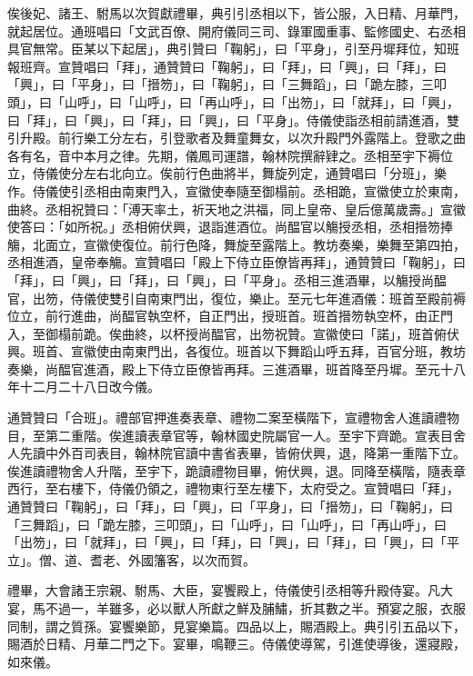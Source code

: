 \begin{pinyinscope}
 俟後妃、諸王、駙馬以次賀獻禮畢，典引引丞相以下，皆公服，入日精、月華門，就起居位。通班唱曰「文武百僚、開府儀同三司、錄軍國重事、監修國史、右丞相具官無常。臣某以下起居」，典引贊曰「鞠躬」，曰「平身」，引至丹墀拜位，知班報班齊。宣贊唱曰「拜」，通贊贊曰「鞠躬」，曰「拜」，曰「興」，曰「拜」，曰「興」，曰「平身」，曰「搢笏」，曰「鞠躬」，曰「三舞蹈」，曰「跪左膝，三叩頭」，曰「山呼」，曰「山呼」，曰「再山呼」，曰「出笏」，曰「就拜」，曰「興」，曰「拜」，曰「興」，曰「拜」，曰「興」，曰「平身」。侍儀使詣丞相前請進酒，雙引升殿。前行樂工分左右，引登歌者及舞童舞女，以次升殿門外露階上。登歌之曲各有名，音中本月之律。先期，儀鳳司運譜，翰林院撰辭肄之。丞相至宇下褥位立，侍儀使分左右北向立。俟前行色曲將半，舞旋列定，通贊唱曰「分班」，樂作。侍儀使引丞相由南東門入，宣徽使奉隨至御榻前。丞相跪，宣徽使立於東南，曲終。丞相祝贊曰：「溥天率土，祈天地之洪福，同上皇帝、皇后億萬歲壽。」宣徽使答曰：「如所祝。」丞相俯伏興，退詣進酒位。尚醖官以觴授丞相，丞相搢笏捧觴，北面立，宣徽使復位。前行色降，舞旋至露階上。教坊奏樂，樂舞至第四拍，丞相進酒，皇帝奉觴。宣贊唱曰「殿上下侍立臣僚皆再拜」，通贊贊曰「鞠躬」，曰「拜」，曰「興」，曰「拜」，曰「興」，曰「平身」。丞相三進酒畢，以觴授尚醖官，出笏，侍儀使雙引自南東門出，復位，樂止。至元七年進酒儀：班首至殿前褥位立，前行進曲，尚醖官執空杯，自正門出，授班首。班首搢笏執空杯，由正門入，至御榻前跪。俟曲終，以杯授尚醖官，出笏祝贊。宣徽使曰「諾」，班首俯伏興。班首、宣徽使由南東門出，各復位。班首以下舞蹈山呼五拜，百官分班，教坊奏樂，尚醖官進酒，殿上下侍立臣僚皆再拜。三進酒畢，班首降至丹墀。至元十八年十二月二十八日改今儀。



 通贊贊曰「合班」。禮部官押進奏表章、禮物二案至橫階下，宣禮物舍人進讀禮物目，至第二重階。俟進讀表章官等，翰林國史院屬官一人。至宇下齊跪。宣表目舍人先讀中外百司表目，翰林院官讀中書省表畢，皆俯伏興，退，降第一重階下立。俟進讀禮物舍人升階，至宇下，跪讀禮物目畢，俯伏興，退。同降至橫階，隨表章西行，至右樓下，侍儀仍領之，禮物東行至左樓下，太府受之。宣贊唱曰「拜」，通贊贊曰「鞠躬」，曰「拜」，曰「興」，曰「平身」，曰「搢笏」，曰「鞠躬」，曰「三舞蹈」，曰「跪左膝，三叩頭」，曰「山呼」，曰「山呼」，曰「再山呼」，曰「出笏」，曰「就拜」，曰「興」，曰「拜」，曰「興」，曰「拜」，曰「興」，曰「平立」。僧、道、耆老、外國籓客，以次而賀。



 禮畢，大會諸王宗親、駙馬、大臣，宴饗殿上，侍儀使引丞相等升殿侍宴。凡大宴，馬不過一，羊雖多，必以獸人所獻之鮮及脯鱐，折其數之半。預宴之服，衣服同制，謂之質孫。宴饗樂節，見宴樂篇。四品以上，賜酒殿上。典引引五品以下，賜酒於日精、月華二門之下。宴畢，鳴鞭三。侍儀使導駕，引進使導後，還寢殿，如來儀。




\end{pinyinscope}
